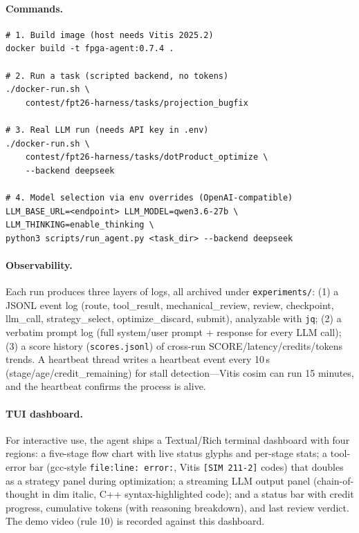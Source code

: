 \documentclass[10pt,conference,letterpaper]{IEEEtran}
\begin{document}
\paragraph{Commands.}
\begin{footnotesize}
\begin{verbatim}
# 1. Build image (host needs Vitis 2025.2)
docker build -t fpga-agent:0.7.4 .

# 2. Run a task (scripted backend, no tokens)
./docker-run.sh \
    contest/fpt26-harness/tasks/projection_bugfix

# 3. Real LLM run (needs API key in .env)
./docker-run.sh \
    contest/fpt26-harness/tasks/dotProduct_optimize \
    --backend deepseek

# 4. Model selection via env overrides (OpenAI-compatible)
LLM_BASE_URL=<endpoint> LLM_MODEL=qwen3.6-27b \
LLM_THINKING=enable_thinking \
python3 scripts/run_agent.py <task_dir> --backend deepseek
\end{verbatim}
\end{footnotesize}

\paragraph{Observability.} Each run produces three layers of logs, all archived under \texttt{experiments/}: (1) a JSONL event log (route, tool\_result, mechanical\_review, review, checkpoint, llm\_call, strategy\_select, optimize\_discard, submit), analyzable with \texttt{jq}; (2) a verbatim prompt log (full system/user prompt + response for every LLM call); (3) a score history (\texttt{scores.jsonl}) of cross-run SCORE/latency/credits/tokens trends. A heartbeat thread writes a heartbeat event every 10\,s (stage/age/credit\_remaining) for stall detection---Vitis cosim can run 15 minutes, and the heartbeat confirms the process is alive.

\paragraph{TUI dashboard.} For interactive use, the agent ships a Textual/Rich terminal dashboard with four regions: a five-stage flow chart with live status glyphs and per-stage stats; a tool-error bar (gcc-style \texttt{file:line: error:}, Vitis \texttt{[SIM 211-2]} codes) that doubles as a strategy panel during optimization; a streaming LLM output panel (chain-of-thought in dim italic, C++ syntax-highlighted code); and a status bar with credit progress, cumulative tokens (with reasoning breakdown), and last review verdict. The demo video (rule 10) is recorded against this dashboard.
\end{document}
